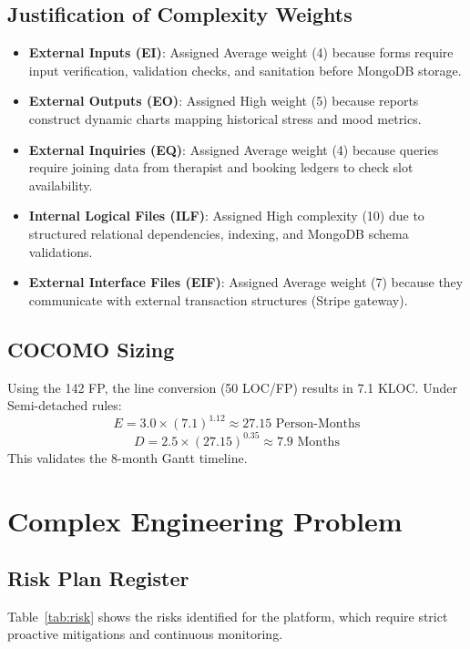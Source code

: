 \documentclass[a4paper,11pt]{report}
\begin{document}
\subsection{Justification of Complexity Weights}
\begin{itemize}
    \item \textbf{External Inputs (EI)}: Assigned Average weight (4) because forms require input verification, validation checks, and sanitation before MongoDB storage.
    \item \textbf{External Outputs (EO)}: Assigned High weight (5) because reports construct dynamic charts mapping historical stress and mood metrics.
    \item \textbf{External Inquiries (EQ)}: Assigned Average weight (4) because queries require joining data from therapist and booking ledgers to check slot availability.
    \item \textbf{Internal Logical Files (ILF)}: Assigned High complexity (10) due to structured relational dependencies, indexing, and MongoDB schema validations.
    \item \textbf{External Interface Files (EIF)}: Assigned Average weight (7) because they communicate with external transaction structures (Stripe gateway).
\end{itemize}

\subsection{COCOMO Sizing}
Using the 142 FP, the line conversion (50 LOC/FP) results in 7.1 KLOC. Under Semi-detached rules:
\[ E = 3.0 \times (7.1)^{1.12} \approx 27.15 \text{ Person-Months} \]
\[ D = 2.5 \times (27.15)^{0.35} \approx 7.9 \text{ Months} \]
This validates the 8-month Gantt timeline.

\section{Complex Engineering Problem}

\subsection{Risk Plan Register}
Table~\ref{tab:risk} shows the risks identified for the platform, which require strict proactive mitigations and continuous monitoring.
\end{document}
